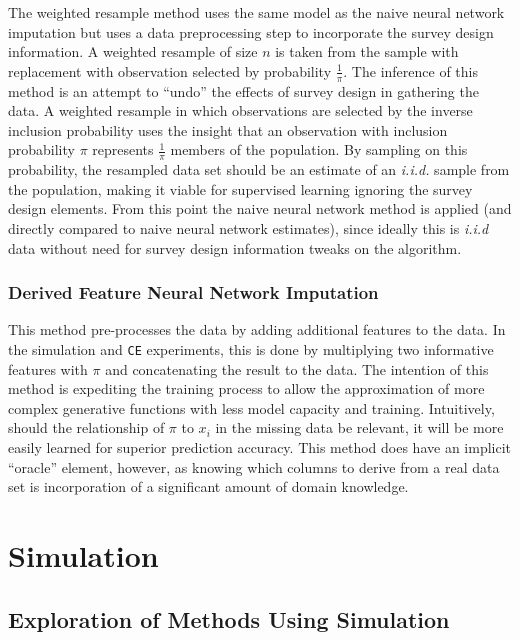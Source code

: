 \documentclass[12pt,twoside]{reedthesis}
\begin{document}
The weighted resample method uses the same model as the naive neural
network imputation but uses a data preprocessing step to incorporate the
survey design information. A weighted resample of size \(n\) is taken
from the sample with replacement with observation selected by
probability \(\frac{1}{\pi}\). The inference of this method is an
attempt to ``undo'' the effects of survey design in gathering the data.
A weighted resample in which observations are selected by the inverse
inclusion probability uses the insight that an observation with
inclusion probability \(\pi\) represents \(\frac{1}{\pi}\) members of
the population. By sampling on this probability, the resampled data set
should be an estimate of an \emph{i.i.d.} sample from the population,
making it viable for supervised learning ignoring the survey design
elements. From this point the naive neural network method is applied
(and directly compared to naive neural network estimates), since ideally
this is \emph{i.i.d} data without need for survey design information
tweaks on the algorithm.

\subsection{Derived Feature Neural Network
Imputation}\label{derived-feature-neural-network-imputation}

This method pre-processes the data by adding additional features to the
data. In the simulation and \texttt{CE} experiments, this is done by
multiplying two informative features with \(\pi\) and concatenating the
result to the data. The intention of this method is expediting the
training process to allow the approximation of more complex generative
functions with less model capacity and training. Intuitively, should the
relationship of \(\pi\) to \(x_i\) in the missing data be relevant, it
will be more easily learned for superior prediction accuracy. This
method does have an implicit ``oracle'' element, however, as knowing
which columns to derive from a real data set is incorporation of a
significant amount of domain knowledge.

\chapter{Simulation}\label{simulation}

\section{Exploration of Methods Using
Simulation}\label{exploration-of-methods-using-simulation}
\end{document}
